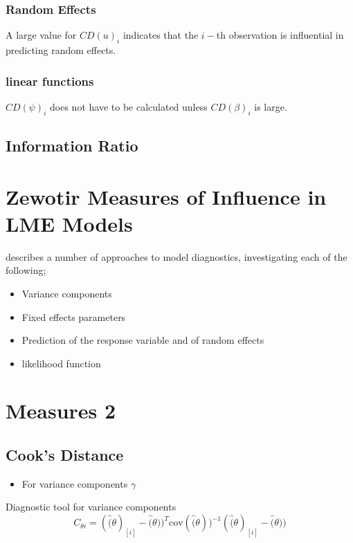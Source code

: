 \documentclass[12pt, a4paper]{article}
\begin{document}
\subsubsection{Random Effects}
A large value for $CD(u)_i$ indicates that the $i-$th observation is influential in predicting random effects.


\subsubsection{linear functions}


$CD(\psi)_i$ does not have to be calculated unless $CD(\beta)_i$ is large.




\subsection{Information Ratio}


\section{Zewotir Measures of Influence in LME Models}%
\citet{Zewotir} describes a number of approaches to model diagnostics, investigating each of the following;
\begin{itemize}
	\item Variance components
	\item Fixed effects parameters
	\item Prediction of the response variable and of random effects
	\item likelihood function
\end{itemize}


\section{Measures 2} %

\subsection{Cook's Distance} %
\begin{itemize}
	\item For variance components $\gamma$
\end{itemize}

Diagnostic tool for variance components
\[ C_{\theta i} =(\hat(\theta)_{[i]} - \hat(\theta))^{T}\mbox{cov}( \hat(\theta))^{-1}(\hat(\theta)_{[i]} - \hat(\theta))\]
\end{document}
